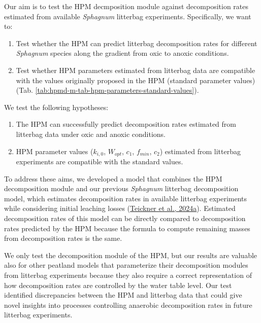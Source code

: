 \documentclass[
  12pt,
]{article}
\begin{document}
Our aim is to test the HPM decmposition module against decomposition rates estimated from available \emph{Sphagnum} litterbag experiments. Specifically, we want to:

\begin{enumerate}
\def\labelenumi{\arabic{enumi}.}
\item
  Test whether the HPM can predict litterbag decomposition rates for different \emph{Sphagnum} species along the gradient from oxic to anoxic conditions.
\item
  Test whether HPM parameters estimated from litterbag data are compatible with the values originally proposed in the HPM (standard parameter values) (Tab. \ref{tab:hpmd-m-tab-hpm-parameters-standard-values}).
\end{enumerate}

We test the following hypotheses:

\begin{enumerate}
\def\labelenumi{\arabic{enumi}.}
\item
  The HPM can successfully predict decomposition rates estimated from litterbag data under oxic and anoxic conditions.
\item
  HPM parameter values (\(k_{i,0}\), \(W_{opt}\), \(c_1\), \(f_{min}\), \(c_2\)) estimated from litterbag experiments are compatible with the standard values.
\end{enumerate}

To address these aims, we developed a model that combines the HPM decomposition module and our previous \emph{Sphagnum} litterbag decomposition model, which estimates decomposition rates in available litterbag experiments while considering initial leaching losses (\protect\hyperlink{ref-Teickner.2024}{Teickner et al., 2024a}). Estimated decomposition rates of this model can be directly compared to decomposition rates predicted by the HPM because the formula to compute remaining masses from decomposition rates is the same.

We only test the decomposition module of the HPM, but our results are valuable also for other peatland models that parameterize their decomposition modules from litterbag experiments because they also require a correct representation of how decomposition rates are controlled by the water table level. Our test identified discrepancies between the HPM and litterbag data that could give novel insights into processes controlling anaerobic decomposition rates in future litterbag experiments.\\
\end{document}
